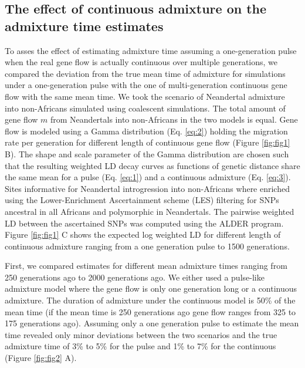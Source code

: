 \documentclass[]{article}
\begin{document}
\subsection{The effect of continuous admixture on the admixture time estimates}\label{the effect of continuous admixture on the admixture time estimates}


To asses the effect of estimating admixture time assuming a one-generation pulse when the real gene flow is actually continuous over multiple generations,
we compared the deviation from the true mean time of admixture for simulations under a one-generation pulse with the one of multi-generation continuous gene flow with the same mean time. We took the scenario of Neandertal admixture into non-Africans simulated using coalescent simulations.
The total amount of gene flow \(m\) from Neandertals into non-Africans
in the two models is equal. Gene flow is modeled using a Gamma
distribution (Eq. \ref{eq:2}) holding the migration rate per generation
for different length of continuous gene flow (Figure \ref{fig:fig1} B).
The shape and scale parameter of the Gamma distribution are chosen such
that the resulting weighted LD decay curves as functions of genetic
distance share the same mean for a pulse (Eq. \ref{eq:1}) and a
continuous admixture (Eq. \ref{eq:3}). Sites informative for Neandertal
introgression into non-Africans where enriched using the
Lower-Enrichment Ascertainment scheme (LES) filtering for SNPs ancestral in
all Africans and polymorphic in Neandertals. The pairwise weighted LD
between the ascertained SNPs was computed using the ALDER program.
Figure \ref{fig:fig1} C shows the expected log weighted LD for different
length of continuous admixture ranging from a one generation pulse to
1500 generations.

First, we compared estimates for different mean admixture times ranging from 250 generations ago to 2000 generations ago. We either used a pulse-like admixture model where the gene flow is only one generation long or a continuous admixture. The duration of admixture under the continuous model is 50\% of the mean time (if the mean time is 250 generations ago gene flow ranges from 325 to 175 generations ago). Assuming only a one generation pulse to estimate the mean time revealed only minor deviations between the two scenarios and the true
admixture time of 3\% to 5\% for the pulse and 1\% to 7\% for the
continuous (Figure \ref{fig:fig2} A). 
\end{document}

